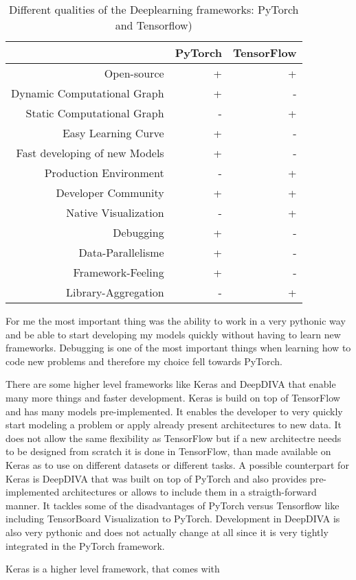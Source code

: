 \begin{table}[t] \centering
{}
\caption{Different qualities of the Deeplearning frameworks: PyTorch and Tensorflow)}
\begin{tabular}{@{}rrr@{}}
\toprule & PyTorch & TensorFlow \\
\midrule
Open-source									& + & + \\
Dynamic Computational Graph			& + & -  \\
Static Computational Graph				& - & +  \\
Easy Learning Curve							& + & -  \\
Fast developing of new Models			& + & -  \\
Production Environment					& - & + \\
Developer Community						& + & + \\
Native Visualization							& - & +  \\
Debugging										& + & -  \\
Data-Parallelisme								& + & -  \\
Framework-Feeling							& + & -  \\
Library-Aggregation							& - & +  \\

\bottomrule
\end{tabular}
\label{tbl:DeepLearningFrameworks}
\end{table}


For me the most important thing was the ability to work in a very pythonic way and be able to start developing my models quickly without having to learn new frameworks. Debugging is one of the most important things when learning how to code new problems and therefore my choice fell towards PyTorch.

There are some higher level frameworks like Keras and DeepDIVA that enable many more things and faster development. Keras is build on top of TensorFlow and has many models pre-implemented. It enables the developer to very quickly start modeling a problem or apply already present architectures to new data. It does not allow the same flexibility as TensorFlow but if a new architectre needs to be designed from scratch it is done in TensorFlow, than made available on Keras as to use on different datasets or different tasks. A possible counterpart for Keras is DeepDIVA that was built on top of PyTorch and also provides pre-implemented architectures or allows to include them in a straigth-forward manner. It tackles some of the disadvantages of PyTorch versus Tensorflow like including TensorBoard Visualization to PyTorch. Development in DeepDIVA is also very pythonic and does not actually change at all since it is very tightly integrated in the PyTorch framework.



Keras is a higher level framework, that comes with 

